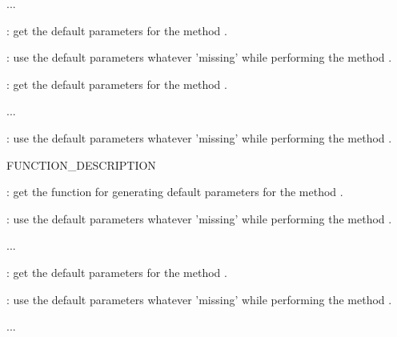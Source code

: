 \documentclass[letterpaper]{book}
\begin{document}
%
\begin{Description}\relax
...

: get the default parameters for the method
.

: use the default parameters whatever 'missing'
while performing the method .

: get the default parameters for the method
.

...

: use the default parameters whatever 'missing'
while performing the method .

FUNCTION\_DESCRIPTION

: get the function for generating
default parameters for the method
.

: use the default parameters whatever 'missing'
while performing the method .

...

: get the default parameters for the method
.

: use the default parameters whatever 'missing'
while performing the method .

...
\end{Description}
%
\end{document}
